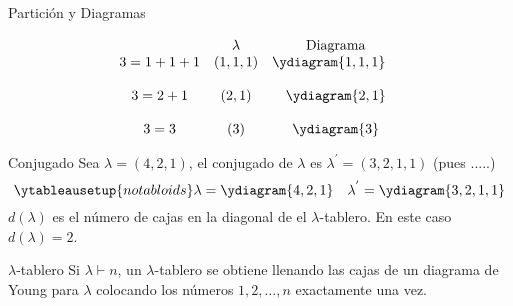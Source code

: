 \documentclass[final,xcolor=svgnames]{beamer}
\begin{document}
\begin{frame}{}
\begin{columns}
\begin{column}{0.5\textwidth}
\begin{block}{Partición y Diagramas}
\begin{minipage}{0.5\linewidth}
        \end{minipage}
        \begin{minipage}{0.48\linewidth}
          \begin{equation*}
            \begin{array}{cccc}
              & \lambda  &\mbox{Diagrama} \\ %
              3=1+1+1   &  (1,1,1) & \ydiagram{1,1,1} \quad\\ %
              \\ 3=2+1   &   (2,1)  &\ydiagram{2,1} \\ %
              \\ 3=3     &   (3)    &\ydiagram{3} %
            \end{array}
          \end{equation*}
        \end{minipage}
      \end{block}

      \begin{block}{Conjugado}
        Sea $\lambda=(4,2,1)$, el \alert{conjugado de $\lambda$} 
        es $\lambda^{'}=(3,2,1,1)$ (pues .....)
        \begin{equation*}
          \ytableausetup{notabloids} 
          \lambda=\ydiagram{4,2,1} \quad
          \lambda^{'}=\ydiagram{3,2,1,1}
        \end{equation*}
        $d(\lambda)$ es el número de cajas en la diagonal de el
        $\lambda$-tablero. En este caso $d(\lambda)=2$.
      \end{block}
     
      \begin{block}{$\lambda$-tablero}
        Si $\lambda\vdash n$, un \alert{$\lambda$-tablero} se obtiene llenando las cajas de un diagrama
        de Young para $\lambda$ colocando los números $1,2,\ldots,n$ exactamente
        una vez.
        

\end{block}
\end{column}
\end{columns}
\end{frame}
\end{document}
